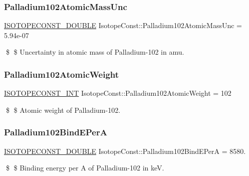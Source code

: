 \subsubsection{\texorpdfstring{Palladium102\+Atomic\+Mass\+Unc}{Palladium102AtomicMassUnc}}
{\footnotesize\ttfamily \mbox{\hyperlink{group___isotope_const-_macros_ga8f45a7272ce02c0b4c65c44636ed719a}{I\+S\+O\+T\+O\+P\+E\+C\+O\+N\+S\+T\+\_\+\+D\+O\+U\+B\+LE}} Isotope\+Const\+::\+Palladium102\+Atomic\+Mass\+Unc = 5.\+94e-\/07}

\$ \$ Uncertainty in atomic mass of Palladium-\/102 in amu. \mbox{\label{group___isotope_const-_palladium-_pd102_ga078b33320abc20d88a0b8e2fb1833cb3}} 
\subsubsection{\texorpdfstring{Palladium102\+Atomic\+Weight}{Palladium102AtomicWeight}}
{\footnotesize\ttfamily \mbox{\hyperlink{group___isotope_const-_macros_ga5f18360b3e99483a35c32d789e62621c}{I\+S\+O\+T\+O\+P\+E\+C\+O\+N\+S\+T\+\_\+\+I\+NT}} Isotope\+Const\+::\+Palladium102\+Atomic\+Weight = 102}

\$ \$ Atomic weight of Palladium-\/102. \mbox{\label{group___isotope_const-_palladium-_pd102_ga56cdd3722f1c4bd6292dcb701d898623}} 
\subsubsection{\texorpdfstring{Palladium102\+Bind\+E\+PerA}{Palladium102BindEPerA}}
{\footnotesize\ttfamily \mbox{\hyperlink{group___isotope_const-_macros_ga8f45a7272ce02c0b4c65c44636ed719a}{I\+S\+O\+T\+O\+P\+E\+C\+O\+N\+S\+T\+\_\+\+D\+O\+U\+B\+LE}} Isotope\+Const\+::\+Palladium102\+Bind\+E\+PerA = 8580.}

\$ \$ Binding energy per A of Palladium-\/102 in keV. \mbox{\label{group___isotope_const-_palladium-_pd102_gae1e23faf1106d57e5866d9e08bc1d555}} 
